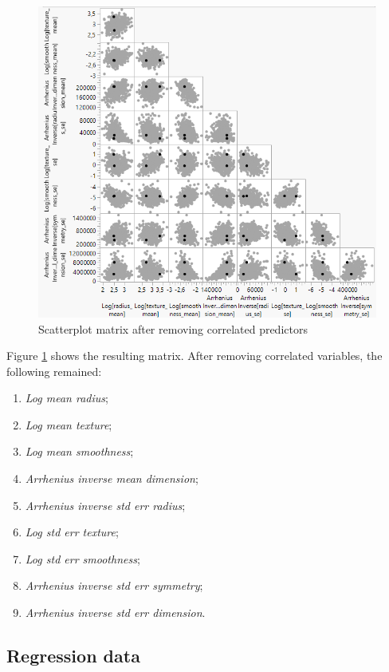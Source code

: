 	\begin{figure}[!ht]
		\centering
		\includegraphics[width=0.9\linewidth]{Rysunki/Rozdzial3/scatter}
		\caption{Scatterplot matrix after removing correlated predictors}
		\label{scatter}
	\end{figure}
	
	Figure \ref{scatter} shows the resulting matrix. After removing correlated variables, the following remained: 
	
	\begin{enumerate}
		\item \textit{Log mean radius};
		\item \textit{Log mean texture};
		\item \textit{Log mean smoothness};
		\item \textit{Arrhenius inverse mean dimension};
		\item \textit{Arrhenius inverse std err radius};
		\item \textit{Log std err texture};
		\item \textit{Log std err smoothness};
		\item \textit{Arrhenius inverse std err symmetry};
		\item \textit{Arrhenius inverse std err dimension}.
	\end{enumerate}

	\subsection{Regression data}	
